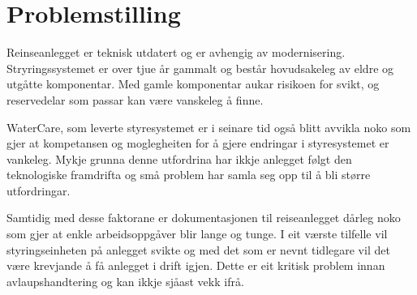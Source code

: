 \section{Problemstilling}
Reinseanlegget er teknisk utdatert og er avhengig av modernisering. Stryringssystemet er over tjue år gammalt
og består hovudsakeleg av eldre og utgåtte komponentar. Med gamle komponentar aukar risikoen for svikt, 
og reservedelar som passar kan være vanskeleg å finne.

WaterCare, som leverte styresystemet er i seinare tid også blitt avvikla noko som gjer at kompetansen 
og moglegheiten for å gjere endringar i styresystemet er vankeleg. 
Mykje grunna denne utfordrina har ikkje anlegget følgt den teknologiske framdrifta 
og små problem har samla seg opp til å bli større utfordringar.

Samtidig med desse faktorane er dokumentasjonen til reiseanlegget dårleg noko som gjer at enkle arbeidsoppgåver blir lange og tunge.
I eit værste tilfelle vil styringseinheten på anlegget svikte og med det som er nevnt tidlegare vil det være krevjande
å få anlegget i drift igjen. Dette er eit kritisk problem innan avlaupshandtering og kan ikkje sjåast vekk ifrå.
